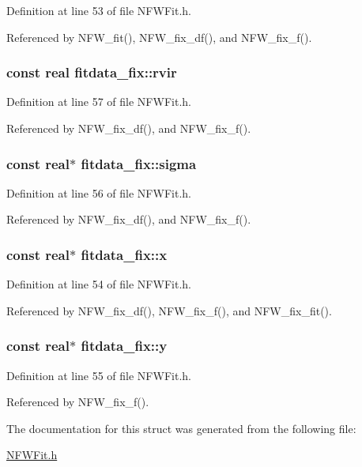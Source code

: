 Definition at line 53 of file NFWFit.h.



Referenced by NFW\_\-fit(), NFW\_\-fix\_\-df(), and NFW\_\-fix\_\-f().

\subsubsection[{rvir}]{\setlength{\rightskip}{0pt plus 5cm}const {\bf real} {\bf fitdata\_\-fix::rvir}}\label{structfitdata__fix_a0f7dc85f6b6c67490c13e36a0c670946}


Definition at line 57 of file NFWFit.h.



Referenced by NFW\_\-fix\_\-df(), and NFW\_\-fix\_\-f().

\subsubsection[{sigma}]{\setlength{\rightskip}{0pt plus 5cm}const {\bf real}$\ast$ {\bf fitdata\_\-fix::sigma}}\label{structfitdata__fix_ad606fe7158b3e91db619bb245e119a2d}


Definition at line 56 of file NFWFit.h.



Referenced by NFW\_\-fix\_\-df(), and NFW\_\-fix\_\-f().

\subsubsection[{x}]{\setlength{\rightskip}{0pt plus 5cm}const {\bf real}$\ast$ {\bf fitdata\_\-fix::x}}\label{structfitdata__fix_a18e0f2f1c447bbfe33ee5c2ca66ca672}


Definition at line 54 of file NFWFit.h.



Referenced by NFW\_\-fix\_\-df(), NFW\_\-fix\_\-f(), and NFW\_\-fix\_\-fit().

\subsubsection[{y}]{\setlength{\rightskip}{0pt plus 5cm}const {\bf real}$\ast$ {\bf fitdata\_\-fix::y}}\label{structfitdata__fix_a3743fa3a545ef48052b42d03542e1d37}


Definition at line 55 of file NFWFit.h.



Referenced by NFW\_\-fix\_\-f().



The documentation for this struct was generated from the following file:\begin{DoxyCompactItemize}
\item 
\hyperlink{NFWFit_8h}{NFWFit.h}\end{DoxyCompactItemize}
